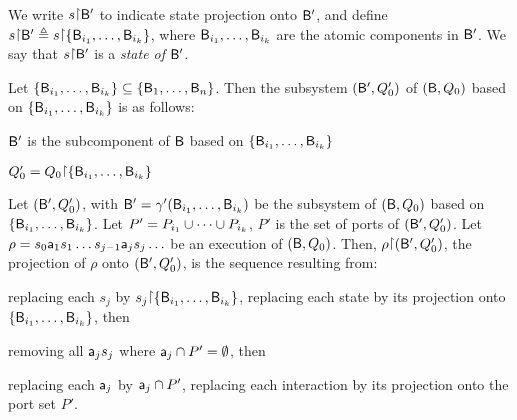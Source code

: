 We write $s \pj \B'$ to indicate state projection onto $\mathsf{B}'$, and define 
$s \pj \B' \df  s \pj \set{\B_{i_1}, \dots, \B_{i_k}}$, where $\mathsf{B}_{i_1},\dots,\mathsf{B}_{i_k}$ are the atomic
components in $\mathsf{B}'$.
%
We say that $s \pj \B'$ is a \emph{state of} $\mathsf{B}'$.




\begin{definition}[Subsystem]
  \label{def.bip.subsystem}
  \label{defn:bip.subsystem}
Let $\{ \mathsf{B}_{i_1},\dots,\mathsf{B}_{i_k} \} \subseteq \{ \mathsf{B}_{1},\dots,\mathsf{B}_{n} \}$.
Then the subsystem $(\mathsf{B}', Q'_0)$ of  $(\mathsf{B}, Q_0)$ based on $\{ \mathsf{B}_{i_1},\dots,\mathsf{B}_{i_k} \}$ is as follows:
\bn
\item $\mathsf{B}'$ is the subcomponent of $\mathsf{B}$ based on $\{ \mathsf{B}_{i_1},\dots,\mathsf{B}_{i_k} \}$ 
\item $Q'_0 = Q_0 \pj \set{\B_{i_1},\dots,\B_{i_k}}$
\en
\end{definition}


\begin{definition}\label{def.bip.execution.projection}
Let $(\mathsf{B}', Q'_0)$, with $\mathsf{B}' = \gamma'(\mathsf{B}_{i_1},\dots,\mathsf{B}_{i_k})$ be the subsystem of $(\mathsf{B}, Q_0)$ based on $\{ \mathsf{B}_{i_1},\dots,\mathsf{B}_{i_k} \}$.
Let $P' = P_{i_1} \cup \cdots \cup P_{i_k}$, \ie $P'$ is the set of ports of $(\mathsf{B}', Q'_0)$.
%
Let $\rho = s_0 \mathsf{a}_1 s_1 \ldots s_{j-1} \mathsf{a}_j s_j \ldots$ be an execution of $(\mathsf{B}, Q_0)$.  Then, $\rho \pj (\B', Q'_0)$, the projection
of $\rho$ onto $(\mathsf{B}', Q'_0)$, is the sequence resulting from:
\bn
\item \label{def.clause.bip.execution.projection.state} 
replacing each $s_j$ by $s_j \pj \set{\B_{i_1},\dots,\B_{i_k}}$, \ie replacing each state by its projection onto
$\{ \mathsf{B}_{i_1},\dots,\mathsf{B}_{i_k} \}$, then

\item \label{def.clause.bip.execution.projection.action} removing all $\mathsf{a}_j s_j$ where $\mathsf{a}_j \cap P' = \emptyset$, then   %

\item \label{def.clause.bip.execution.projection.port} replacing each $\mathsf{a}_j$ by $\mathsf{a}_j \cap P'$, \ie replacing each
interaction by its projection onto the port set $P'$.

\en
\end{definition}



